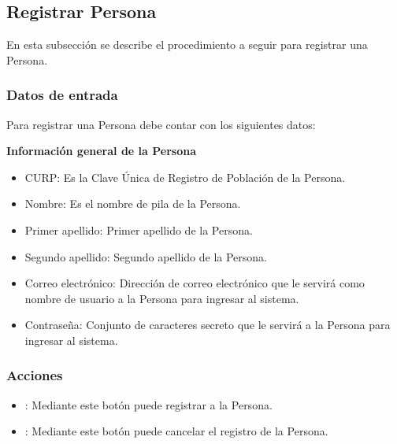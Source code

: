 \subsection{Registrar Persona}

En esta subsección se describe el procedimiento a seguir para registrar una Persona.


\subsubsection{Datos de entrada}
\begin{description}
	\item Para registrar una Persona debe contar con los siguientes datos: \hspace{10pt}
	
	\begin{description}
	    \item \textbf{Información general de la Persona}
	    \begin{itemize}
		  \item CURP: Es la Clave Única de Registro de Población de la Persona.
		  \item Nombre: Es el nombre de pila de la Persona.
		  \item Primer apellido: Primer apellido de la Persona.
		  \item Segundo apellido: Segundo apellido de la Persona.
		  \item Correo electrónico: Dirección de correo electrónico que le servirá como nombre de usuario a la Persona para ingresar al sistema.
		  \item Contraseña: Conjunto de caracteres secreto que le servirá a la Persona para ingresar al sistema.
	    \end{itemize}
	 \end{description}
\end{description}

\subsubsection{Acciones}
\begin{itemize}
  \item {}: Mediante este botón puede registrar a la Persona.
  \item {}: Mediante este botón puede cancelar el registro de la Persona.
\end{itemize}


